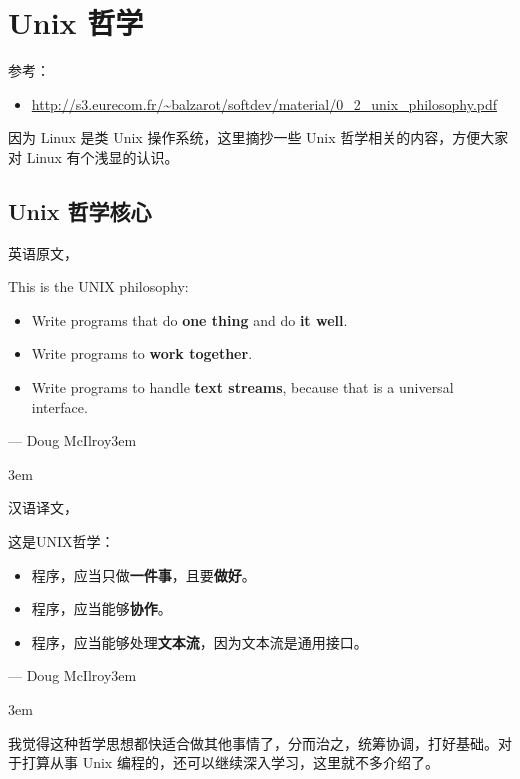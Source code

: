 \documentclass[doctor,openright,twoside]{sjtuthesis}
\def\VA#1#2{\addvspace{12pt}\raggedleft #1\rightskip3em\par #2\rightskip3em}
\renewenvironment{quote}
  {\list{}{\rightmargin\leftmargin}%
    \item\relax}
  {\endlist}
\providecommand{\tightlist}{%
    \setlength{\itemsep}{0pt}\setlength{\parskip}{0pt}}
\theoremstyle{plain}
\theoremstyle{definition}
\theoremstyle{remark}
\theoremstyle{ocrenumbox}
\theoremstyle{plain}
\begin{document}
\hypertarget{unix-}{%
\section{Unix 哲学}\label{unix-}}

参考：

\begin{itemize}
\tightlist
\item
  \url{http://s3.eurecom.fr/~balzarot/softdev/material/0_2_unix_philosophy.pdf}
\end{itemize}

因为 Linux 是类 Unix 操作系统，这里摘抄一些 Unix 哲学相关的内容，方便大家对 Linux 有个浅显的认识。

\hypertarget{unix--1}{%
\subsection{Unix 哲学核心}\label{unix--1}}

英语原文，

\begin{quote}
This is the UNIX philosophy:

\begin{itemize}
\tightlist
\item
  Write programs that do \textbf{one thing} and do \textbf{it well}.
\item
  Write programs to \textbf{work together}.
\item
  Write programs to handle \textbf{text streams}, because that is a universal interface.
\end{itemize}

\VA{--- Doug McIlroy}{}
\end{quote}

汉语译文，

\begin{quote}
这是UNIX哲学：

\begin{itemize}
\tightlist
\item
  程序，应当只做\textbf{一件事}，且要\textbf{做好}。
\item
  程序，应当能够\textbf{协作}。
\item
  程序，应当能够处理\textbf{文本流}，因为文本流是通用接口。
\end{itemize}

\VA{--- Doug McIlroy}{}
\end{quote}

我觉得这种哲学思想都快适合做其他事情了，分而治之，统筹协调，打好基础。对于打算从事 Unix 编程的，还可以继续深入学习，这里就不多介绍了。
\end{document}
